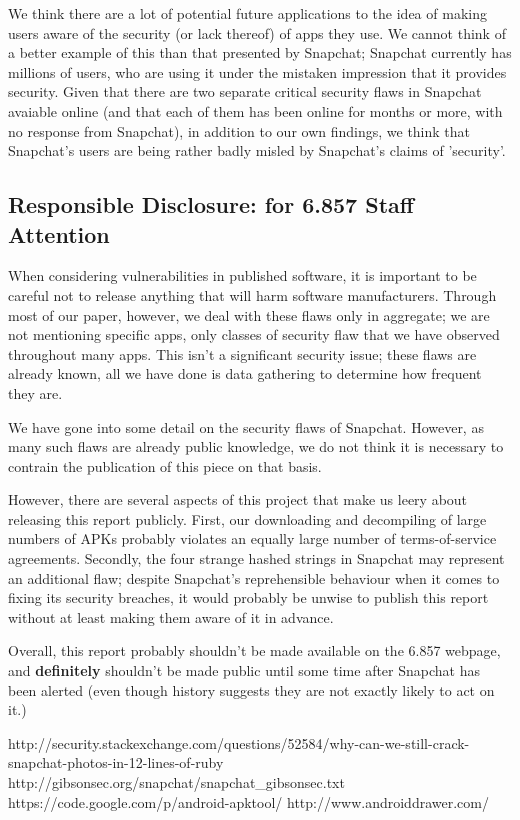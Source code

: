 \documentclass[11pt]{article}
\numberwithin{theorem}{subsection}
\begin{document}
We think there are a lot of potential future applications to the idea of making users aware of the security (or lack thereof) of apps they use.  We
cannot think of a better example of this than that presented by Snapchat; Snapchat currently has millions of users, who are using it under the
mistaken impression that it provides security.  Given that there are two separate critical security flaws in Snapchat avaiable online (and that
each of them has been online for months or more, with no response from Snapchat), in addition to our own findings, we think that Snapchat's users are being
rather badly misled by Snapchat's claims of 'security'.

\subsection{Responsible Disclosure: for 6.857 Staff Attention}

When considering vulnerabilities in published software, it is important to be careful not to release anything that will harm software manufacturers.
Through most of our paper, however, we deal with these flaws only in aggregate; we are not mentioning specific apps, only classes of security
flaw that we have observed throughout many apps.  This isn't a significant security issue; these flaws are already known, all we have done is
data gathering to determine how frequent they are.

We have gone into some detail on the security flaws of Snapchat.  However, as many such flaws are already public knowledge\cite{1}\cite{2}, we do
not think it is necessary to contrain the publication of this piece on that basis.

However, there are several aspects of this project that make us leery about releasing this report publicly.  First, our downloading and decompiling
of large numbers of APKs probably violates an equally large number of terms-of-service agreements.  Secondly, the four strange hashed strings in Snapchat 
may represent an additional flaw; despite Snapchat's reprehensible behaviour when it comes to fixing its security breaches, it would probably be unwise 
to publish this report without at least making them aware of it in advance.

Overall, this report probably shouldn't be made available on the 6.857 webpage, and \textbf{definitely} shouldn't be made public until some time after
Snapchat has been alerted (even though history suggests they are not exactly likely to act on it.) 

\begin{thebibliography}{9}

        http://security.stackexchange.com/questions/52584/why-can-we-still-crack-snapchat-photos-in-12-lines-of-ruby
        http://gibsonsec.org/snapchat/snapchat\_gibsonsec.txt
        https://code.google.com/p/android-apktool/
        http://www.androiddrawer.com/

\end{thebibliography}
\end{document}
